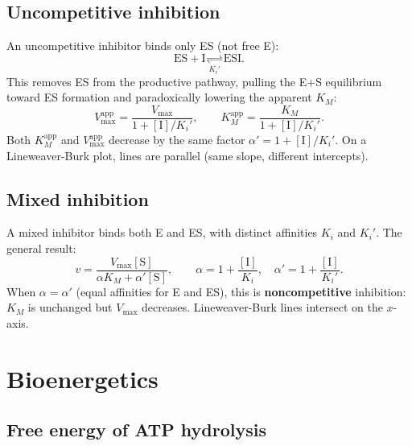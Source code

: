 \documentclass[12pt, a4paper, oneside]{report}
\begin{document}
\subsection{Uncompetitive inhibition}

An uncompetitive inhibitor binds only ES (not free E):
\[
  \mathrm{ES} + \mathrm{I} \underset{K_i'}{\rightleftharpoons} \mathrm{ESI}.
\]
This removes ES from the productive pathway, pulling the E+S equilibrium
toward ES formation and paradoxically lowering the apparent $K_M$:
\begin{equation}
  V_{\max}^\text{app} = \frac{V_{\max}}{1 + [\mathrm{I}]/K_i'},
  \qquad
  K_M^\text{app} = \frac{K_M}{1 + [\mathrm{I}]/K_i'}.
  \label{eq:uncompetitive}
\end{equation}
Both $K_M^\text{app}$ and $V_{\max}^\text{app}$ decrease by the same
factor $\alpha' = 1 + [\mathrm{I}]/K_i'$. On a Lineweaver-Burk plot,
lines are parallel (same slope, different intercepts).

\subsection{Mixed inhibition}

A mixed inhibitor binds both E and ES, with distinct affinities $K_i$
and $K_i'$. The general result:
\begin{equation}
  v = \frac{V_{\max}[\mathrm{S}]}{\alpha K_M + \alpha'[\mathrm{S}]},
  \qquad
  \alpha = 1 + \frac{[\mathrm{I}]}{K_i},
  \quad
  \alpha' = 1 + \frac{[\mathrm{I}]}{K_i'}.
  \label{eq:mixed}
\end{equation}
When $\alpha = \alpha'$ (equal affinities for E and ES), this is
\textbf{noncompetitive} inhibition: $K_M$ is unchanged but $V_{\max}$
decreases. Lineweaver-Burk lines intersect on the $x$-axis.

\section{Bioenergetics}

\subsection{Free energy of ATP hydrolysis}
\end{document}

